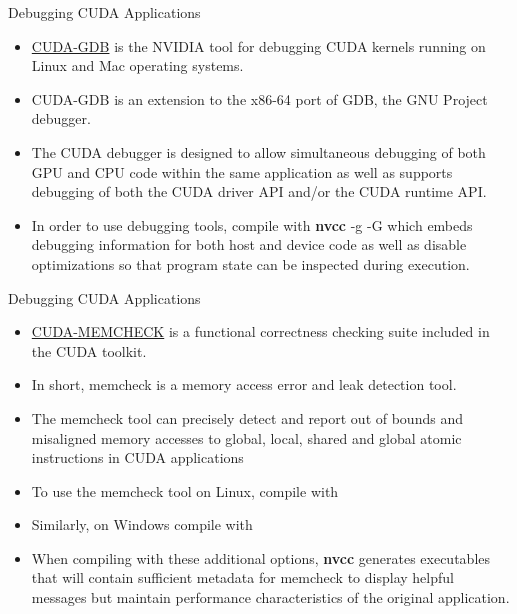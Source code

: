\documentclass[handout]{beamer}
\begin{document}
\begin{frame}{Debugging CUDA Applications}

\begin{itemize}
\itemsep1em
	\item<1->\href{http://docs.nvidia.com/cuda/cuda-gdb/index.html}{\color{blue}CUDA-GDB} is the NVIDIA tool for debugging CUDA kernels running on Linux and Mac operating systems.
	\item<1->CUDA-GDB is an extension to the x86-64 port of GDB, the GNU Project debugger.
	\item<1->The CUDA debugger is designed to allow simultaneous debugging of both GPU and CPU code within the same application as well as supports debugging of both the CUDA driver API and/or the CUDA runtime API.
	\item<1->In order to use debugging tools, compile with \textbf{{\selectfont nvcc}} {\selectfont -g -G} which embeds debugging information for both host and device code as well as disable optimizations so that program state can be inspected during execution.
\end{itemize}
	
\end{frame}

\begin{frame}{Debugging CUDA Applications}

\begin{itemize}
	\item<1->\href{http://docs.nvidia.com/cuda/cuda-memcheck/index.html}{\color{blue}CUDA-MEMCHECK} is a functional correctness checking suite included in the CUDA toolkit.
	\item<1->In short, {\selectfont memcheck} is a memory access error and leak detection tool.
	\item<1->The {\selectfont memcheck} tool can precisely detect and report out of bounds and misaligned memory accesses to global, local, shared and global atomic instructions in CUDA applications
	\item<1->To use the {\selectfont memcheck} tool on Linux, compile with   
	\item<1->Similarly, on Windows compile with  
	\item<1->When compiling with these additional options, {\selectfont \textbf{nvcc}} generates executables  that will contain sufficient metadata for {\selectfont memcheck} to display helpful messages but maintain performance characteristics of the original application. 
\end{itemize}
	
\end{frame}
\end{document}
